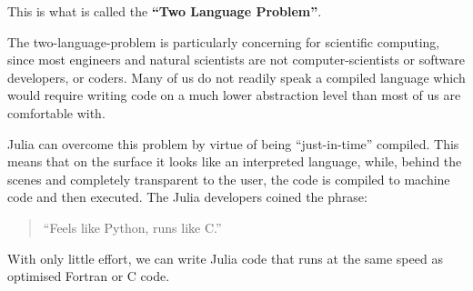 \documentclass[
  a4paper,
  DIV=11,
  numbers=noendperiod,
  oneside]{scrreprt}
\begin{document}
This is what is called the \textbf{``Two Language Problem''}.

The two-language-problem is particularly concerning for scientific
computing, since most engineers and natural scientists are not
computer-scientists or software developers, or coders. Many of us do not
readily speak a compiled language which would require writing code on a
much lower abstraction level than most of us are comfortable
with.

Julia can overcome this problem by virtue of being ``just-in-time''
compiled. This means that on the surface it looks like an interpreted
language, while, behind the scenes and completely transparent to the
user, the code is compiled to machine code and then executed. The Julia
developers coined the phrase:

\begin{quote}
``Feels like Python, runs like C.''
\end{quote}

With only little effort, we can write Julia code that runs at the same
speed as optimised Fortran or C code.
\end{document}
